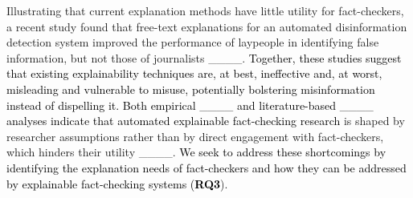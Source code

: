 Illustrating that current explanation methods have little utility for fact-checkers, a recent study found that free-text explanations for an automated disinformation detection system improved the performance of laypeople in identifying false information, but not those of journalists ____.
\textcolor{black}{Together, these studies suggest that existing explainability techniques are, at best, ineffective and, at worst, misleading and vulnerable to misuse, potentially bolstering misinformation instead of dispelling it.
Both empirical ____ and literature-based ____ analyses indicate that automated explainable fact-checking research} is shaped by researcher assumptions rather than by direct engagement with fact-checkers, which hinders their utility ____.
\textcolor{black}{We seek to address these shortcomings by identifying the explanation needs of fact-checkers and how they can be addressed by explainable fact-checking systems (\textbf{RQ3}}).


